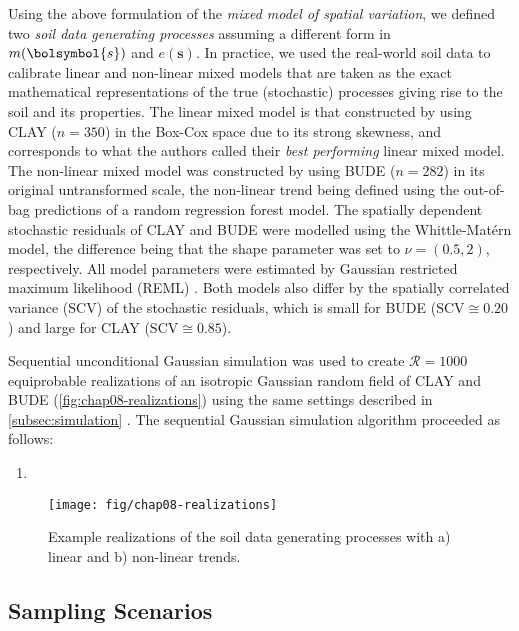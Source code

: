 Using the above formulation of the \emph{mixed model of spatial variation}, we defined two \emph{soil 
data generating processes} assuming a different form in $m(\bolsymbol{s})$ and $e(\boldsymbol{s})$. In 
practice, we used the real-world soil data to calibrate linear and non-linear mixed models that are taken as 
the exact mathematical representations of the true (stochastic) processes giving rise to the soil and its 
properties. The linear mixed model is that constructed by \citet{Samuel-RosaEtAl2015} using CLAY ($n = 350$) in 
the Box-Cox space due to its strong skewness, and corresponds to what the authors called their \emph{best 
performing} linear mixed model. The non-linear mixed model was constructed by \citet{Samuel-RosaEtAl} using 
BUDE ($n = 282$) in its original untransformed scale, the non-linear trend being defined using the out-of-bag 
predictions of a random regression forest model. The spatially dependent stochastic residuals of CLAY and BUDE 
were modelled using the Whittle-Matérn model, the difference being that the shape parameter was set to $\nu = 
(0.5, 2)$, respectively. All model parameters were estimated by Gaussian restricted maximum likelihood (REML) 
\cite{LarkEtAl2004, DiggleEtAl2007}. Both models also differ by the spatially correlated variance (SCV) of the 
stochastic residuals, which is small for BUDE ($\text{SCV} \cong 0.20$) and large for CLAY ($\text{SCV} \cong 
0.85$).

Sequential unconditional Gaussian simulation was used to create $\mathcal{R} = 1000$ equiprobable realizations 
of an isotropic Gaussian random field of CLAY and BUDE (\autoref{fig:chap08-realizations}) using the same 
settings described in \autoref{subsec:simulation} \cite{Samuel-RosaEtAl}. The sequential Gaussian simulation 
algorithm proceeded as follows:

\begin{enumerate}
 \item 
\end{enumerate}

 
\begin{figure}[!ht]
 \centering
 \texttt{[image: fig/chap08-realizations]}
 \caption{Example realizations of the soil data generating processes with a) linear and b) non-linear trends.}
 \label{fig:chap08-realizations}
\end{figure}

\subsection{Sampling Scenarios}

